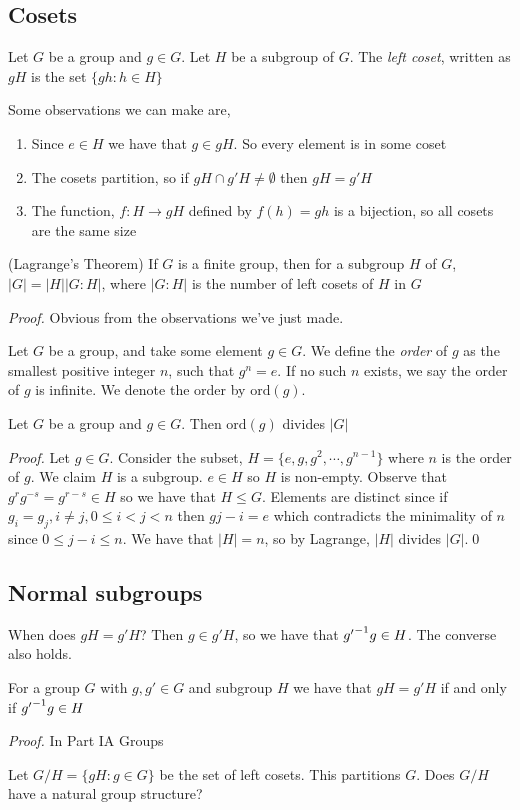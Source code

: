 \documentclass{article}
\begin{document}
	\subsection{Cosets}
	\begin{definition}
		Let $ G $ be a group and $ g\in G $. Let $ H $ be a subgroup of $ G $. The \textit{left coset}, written as $ gH $ is the set $ \{gh : h\in H\} $
	\end{definition}
Some observations we can make are,
\begin{enumerate}
	\item Since $ e\in H $ we have that $ g\in gH $. So every element is in some coset
	\item The cosets partition, so if $ gH\cap g'H\ne \emptyset $ then $ gH=g'H $
	\item The function, $ f: H\rightarrow gH $ defined by $ f(h)= gh $ is a bijection, so all cosets are the same size
\end{enumerate}
\begin{theorem}
	(Lagrange's Theorem) If $ G $ is a finite group, then for a subgroup $ H $ of $ G $, $ |G|=|H||G:H| $, where $ |G:H| $ is the number of left cosets of $ H $ in $ G $
\end{theorem}
\textit{Proof.} Obvious from the observations we've just made.

\begin{definition}
	Let $ G $ be a group, and take some element $ g\in G $. We define the \textit{order} of $ g $ as the smallest positive integer $ n $, such that $ g^n = e $. If no such $ n $ exists, we say the order of $ g $ is infinite. We denote the order by $ \mathrm {ord}(g) $.
\end{definition}
\begin{proposition}
	Let $ G $ be a group and $ g\in G $. Then $ \mathrm {ord}(g) $ divides $ |G| $
\end{proposition}
\textit{Proof.} Let $ g\in G $. Consider the subset, $ H=\{e, g, g^2,\cdots, g^{n-1}\} $ where $ n $ is the order of $ g $. We claim $ H $ is a subgroup. $ e\in H $ so $ H  $ is non-empty. Observe that $ g^rg^{-s}=g^{r-s}\in H $ so we have that $ H\le G $. Elements are distinct since if $ g_i=g_j, i\ne j, 0\le i<j<n $ then $ g{j-i}=e $ which contradicts the minimality of $ n $ since $ 0\le j-i\le n $. We have that $ |H|=n $, so by Lagrange, $ |H| $ divides $ |G| $.\qed
\subsection{Normal subgroups}
When does $ gH=g'H $? Then $ g\in g'H $, so we have that $ {g'}^{-1}g\in H $. The converse also holds.
\begin{lemma}
	For a group $ G $ with $ g, g'\in G $ and subgroup $ H $ we have that $ gH=g'H $ if and only if $ {g'}^{-1} g\in H $
\end{lemma}
\textit{Proof.} In Part IA Groups
\par
Let $ G/H = \{gH:g\in G\} $ be the set of left cosets. This partitions $ G $. Does $ G/H $ have a natural group structure?
\end{document}
